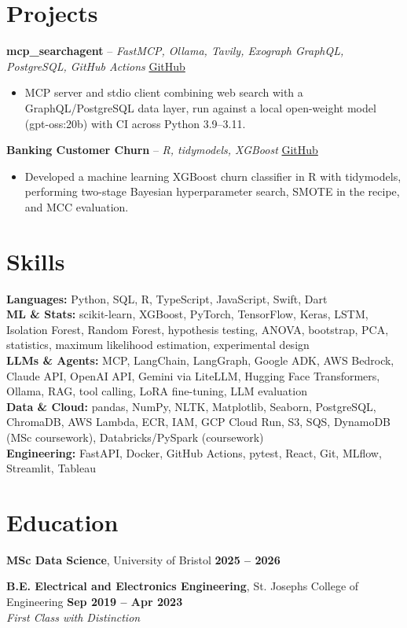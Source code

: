 \documentclass[a4paper,10pt]{article}
\begin{document}
\section{Projects}
\noindent\textbf{mcp\_searchagent} -- \textit{FastMCP, Ollama, Tavily, Exograph GraphQL, PostgreSQL, GitHub Actions} \hfill \href{https://github.com/Thiruvel-AP/mcp_searchagent}{GitHub}
\begin{itemize}
  \item MCP server and stdio client combining web search with a GraphQL/PostgreSQL data layer, run against a local open-weight model (gpt-oss:20b) with CI across Python 3.9–3.11.
\end{itemize}
\noindent\textbf{Banking Customer Churn} -- \textit{R, tidymodels, XGBoost} \hfill \href{https://github.com/Thiruvel-AP/Banking-Customer-Churn-Prediction}{GitHub}
\begin{itemize}
  \item Developed a machine learning XGBoost churn classifier in R with tidymodels, performing two-stage Bayesian hyperparameter search, SMOTE in the recipe, and MCC evaluation.
\end{itemize}

\section{Skills}
\textbf{Languages:} Python, SQL, R, TypeScript, JavaScript, Swift, Dart\\
\textbf{ML \& Stats:} scikit-learn, XGBoost, PyTorch, TensorFlow, Keras, LSTM, Isolation Forest, Random Forest, hypothesis testing, ANOVA, bootstrap, PCA, statistics, maximum likelihood estimation, experimental design\\
\textbf{LLMs \& Agents:} MCP, LangChain, LangGraph, Google ADK, AWS Bedrock, Claude API, OpenAI API, Gemini via LiteLLM, Hugging Face Transformers, Ollama, RAG, tool calling, LoRA fine-tuning, LLM evaluation\\
\textbf{Data \& Cloud:} pandas, NumPy, NLTK, Matplotlib, Seaborn, PostgreSQL, ChromaDB, AWS Lambda, ECR, IAM, GCP Cloud Run, S3, SQS, DynamoDB (MSc coursework), Databricks/PySpark (coursework)\\
\textbf{Engineering:} FastAPI, Docker, GitHub Actions, pytest, React, Git, MLflow, Streamlit, Tableau

\section{Education}
\textbf{MSc Data Science}, University of Bristol \hfill \textbf{2025 – 2026}\par
\vspace{2pt}
\textbf{B.E. Electrical and Electronics Engineering}, St. Joseph\textquotesingle{}s College of Engineering \hfill \textbf{Sep 2019 – Apr 2023}\\ \textit{First Class with Distinction}\par
\end{document}
